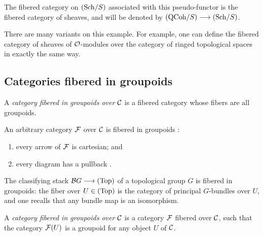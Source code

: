 \begin{3   FIBERED CATEGORIES}
\begin{3.2 Examples of fibered categories}
The fibered category on $({\mathrm{Sch}/S})$ associated with this pseudo-functor is the fibered category of \qc sheaves, and will be denoted by $\catqc{S} \arr \catsch{S}$.

There are many variants on  this example. For example, one can define the fibered category of sheaves of $\mathcal{O}$-modules over the category of ringed topological spaces in exactly the same way.









\end{3.2 Examples of fibered categories}
\begin{3.3 Categories fibered in groupoids}
\setcounter{section}{2}
\section{Categories fibered in groupoids}
\setcounter{theorem}{20}
\hfil
\begin{shaded}
A \emph{category fibered in groupoids over $\mathcal{C}$} is a fibered category whose fibers are all groupoids. 

An arbitrary category $\mathcal{F}$ over $\mathcal{C}$ is fibered in groupoids \Iff:
\begin{enumerate}\squishlist
\item every arrow of $\mathcal{F}$ is cartesian; and
\item every %
 diagram
  has a pullback
.
\end{enumerate}
The classifying stack $\mathcal{B} G\longrightarrow(\mathrm{Top})$ of a topological group $G$ is fibered in groupoids: the fiber over $U\in(\mathrm{Top})$ is the category of principal $G$-bundles over $U$, and one recalls that any bundle map is an isomorphism.
\end{shaded}

\begin{definition} A \emph{category fibered in groupoids over $\mathcal{C}$}%
%
 is a category $\mathcal{F}$ fibered over $\mathcal{C}$, such that the category $\mathcal{F}(U)$ is a groupoid for any object $U$ of $\mathcal{C}$.
\end{definition}


\end{3.3 Categories fibered in groupoids}
\end{3   FIBERED CATEGORIES}
